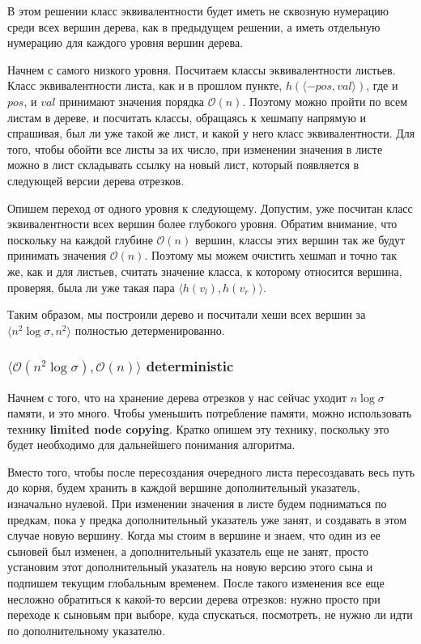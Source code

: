 В этом решении класс эквивалентности будет иметь не сквозную нумерацию среди всех вершин дерева, как в предыдущем решении, а иметь отдельную нумерацию для каждого уровня вершин дерева.

Начнем с самого низкого уровня. Посчитаем классы эквивалентности листьев. Класс эквивалентности листа, как и в прошлом пункте, $h(\langle -pos, val \rangle)$, где и $pos$, и $val$ принимают значения порядка $\mathcal{O}(n)$. Поэтому можно пройти по всем листам в дереве, и посчитать классы, обращаясь к хешмапу напрямую и спрашивая, был ли уже такой же лист, и какой у него класс эквивалентности. Для того, чтобы обойти все листы за их число, при изменении значения в листе можно в лист складывать ссылку на новый лист, который появляется в следующей версии дерева отрезков.

Опишем переход от одного уровня к следующему. Допустим, уже посчитан класс эквивалентности всех вершин более глубокого уровня. Обратим внимание, что поскольку на каждой глубине $\mathcal{O}(n)$ вершин, классы этих вершин так же будут принимать значения $\mathcal{O}(n)$. Поэтому мы можем очистить хешмап и точно так же, как и для листьев, считать значение класса, к которому относится вершина, проверяя, была ли уже такая пара $\langle h(v_l), h(v_r) \rangle$.

Таким образом, мы построили дерево и посчитали хеши всех вершин за $\langle n^2 \log \sigma, n^2 \rangle$ полностью детерменированно.


\subsubsection{$\langle \mathcal{O}(n^2 \log \sigma), \mathcal{O}(n) \rangle$ deterministic}

Начнем с того, что на хранение дерева отрезков у нас сейчас уходит $n \log \sigma$ памяти, и это много. Чтобы уменьшить потребление памяти, можно использовать технику \textbf{limited node copying}. Кратко опишем эту технику, поскольку это будет необходимо для дальнейшего понимания алгоритма. %

Вместо того, чтобы после пересоздания очередного листа пересоздавать весь путь до корня, будем хранить в каждой вершине дополнительный указатель, изначально нулевой. При изменении значения в листе будем подниматься по предкам, пока у предка дополнительный указатель уже занят, и создавать в этом случае новую вершину. Когда мы стоим в вершине и знаем, что один из ее сыновей был изменен, а дополнительный указатель еще не занят, просто установим этот дополнительный указатель на новую версию этого сына и подпишем текущим глобальным временем. После такого изменения все еще несложно обратиться к какой-то версии дерева отрезков: нужно просто при переходе к сыновьям при выборе, куда спускаться, посмотреть, не нужно ли идти по дополнительному указателю.

